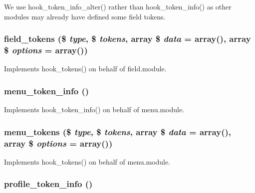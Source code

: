 We use hook\_\-token\_\-info\_\-alter() rather than hook\_\-token\_\-info() as other modules may already have defined some field tokens. \hypertarget{token_8tokens_8inc_a2db53cfa66a34afc752a40a00c03d9ca}{
\subsubsection[{field\_\-tokens}]{\setlength{\rightskip}{0pt plus 5cm}field\_\-tokens (\$ {\em type}, \/  \$ {\em tokens}, \/  array \$ {\em data} = {\ttfamily array()}, \/  array \$ {\em options} = {\ttfamily array()})}}
\label{token_8tokens_8inc_a2db53cfa66a34afc752a40a00c03d9ca}
Implements hook\_\-tokens() on behalf of field.module. \hypertarget{token_8tokens_8inc_a285b335dc2753c36919b35c473a08cdd}{
\subsubsection[{menu\_\-token\_\-info}]{\setlength{\rightskip}{0pt plus 5cm}menu\_\-token\_\-info ()}}
\label{token_8tokens_8inc_a285b335dc2753c36919b35c473a08cdd}
Implements hook\_\-token\_\-info() on behalf of menu.module. \hypertarget{token_8tokens_8inc_a34b9f49bd301ee8ffcba2620ec02b154}{
\subsubsection[{menu\_\-tokens}]{\setlength{\rightskip}{0pt plus 5cm}menu\_\-tokens (\$ {\em type}, \/  \$ {\em tokens}, \/  array \$ {\em data} = {\ttfamily array()}, \/  array \$ {\em options} = {\ttfamily array()})}}
\label{token_8tokens_8inc_a34b9f49bd301ee8ffcba2620ec02b154}
Implements hook\_\-tokens() on behalf of menu.module. \hypertarget{token_8tokens_8inc_ab97ba048343fb5e851742c14a5094dff}{
\subsubsection[{profile\_\-token\_\-info}]{\setlength{\rightskip}{0pt plus 5cm}profile\_\-token\_\-info ()}}
